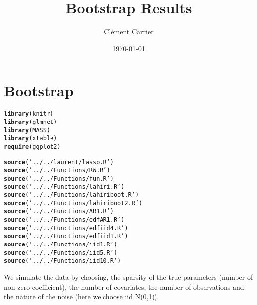 \documentclass[11pt,oneside, a4paper]{amsart}\usepackage[]{graphicx}\usepackage[]{color}
\makeatletter
\newcommand{\hlstr}[1]{\textcolor[rgb]{0.192,0.494,0.8}{#1}}%
\newcommand{\hlstd}[1]{\textcolor[rgb]{0.345,0.345,0.345}{#1}}%
\newcommand{\hlkwd}[1]{\textcolor[rgb]{0.737,0.353,0.396}{\textbf{#1}}}%
\newenvironment{kframe}{%
 \def\at@end@of@kframe{}%
 \ifinner\ifhmode%
  \def\at@end@of@kframe{\end{minipage}}%
  \begin{minipage}{\columnwidth}%
 \fi\fi%
 \def\FrameCommand##1{\hskip\@totalleftmargin \hskip-\fboxsep
 \colorbox{shadecolor}{##1}\hskip-\fboxsep
     \hskip-\linewidth \hskip-\@totalleftmargin \hskip\columnwidth}%
 \MakeFramed {\advance\hsize-\width
   \@totalleftmargin\z@ \linewidth\hsize
   \@setminipage}}%
 {\par\unskip\endMakeFramed%
 \at@end@of@kframe}
\newenvironment{knitrout}{}{} %
\makeatother
\begin{document}
  
\title{Bootstrap Results}   
\author{Clément Carrier}
\date{\today}
\maketitle


\section*{Bootstrap}


\begin{knitrout}
\color{fgcolor}\begin{kframe}
\begin{alltt}
\hlkwd{library}\hlstd{(knitr)}
\hlkwd{library}\hlstd{(glmnet)}
\hlkwd{library}\hlstd{(MASS)}
\hlkwd{library}\hlstd{(xtable)}
\hlkwd{require}\hlstd{(ggplot2)}
\end{alltt}
\end{kframe}
\end{knitrout}




\begin{knitrout}
\color{fgcolor}\begin{kframe}
\begin{alltt}
\hlkwd{source}\hlstd{(}\hlstr{'../../laurent/lasso.R'}\hlstd{)}
\hlkwd{source}\hlstd{(}\hlstr{'../../Functions/RW.R'}\hlstd{)}
\hlkwd{source}\hlstd{(}\hlstr{'../../Functions/fun.R'}\hlstd{)}
\hlkwd{source}\hlstd{(}\hlstr{'../../Functions/lahiri.R'}\hlstd{)}
\hlkwd{source}\hlstd{(}\hlstr{'../../Functions/lahiriboot.R'}\hlstd{)}
\hlkwd{source}\hlstd{(}\hlstr{'../../Functions/lahiriboot2.R'}\hlstd{)}
\hlkwd{source}\hlstd{(}\hlstr{'../../Functions/AR1.R'}\hlstd{)}
\hlkwd{source}\hlstd{(}\hlstr{'../../Functions/edfAR1.R'}\hlstd{)}
\hlkwd{source}\hlstd{(}\hlstr{'../../Functions/edfiid4.R'}\hlstd{)}
\hlkwd{source}\hlstd{(}\hlstr{'../../Functions/edfiid1.R'}\hlstd{)}
\hlkwd{source}\hlstd{(}\hlstr{'../../Functions/iid1.R'}\hlstd{)}
\hlkwd{source}\hlstd{(}\hlstr{'../../Functions/iid5.R'}\hlstd{)}
\hlkwd{source}\hlstd{(}\hlstr{'../../Functions/iid10.R'}\hlstd{)}
\end{alltt}
\end{kframe}
\end{knitrout}


We simulate the data by choosing, the sparsity of the true parameters (number of non zero coefficient), the number of covariates, the number of observations and the nature of the noise (here we choose iid N(0,1)). 
\end{document}
